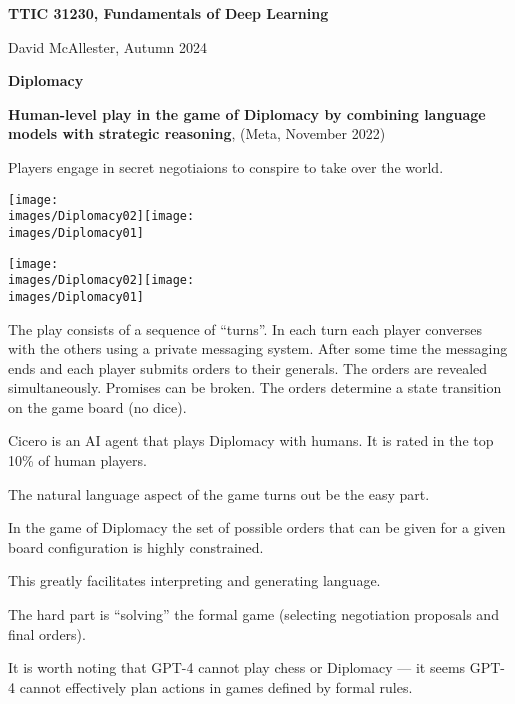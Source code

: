 




{\Huge

  \centerline{\bf TTIC 31230, Fundamentals of Deep Learning}
  \bigskip
  \centerline{David McAllester, Autumn 2024}


  \vfill
  \centerline{\bf Diplomacy}
  \vfill
  \vfill


{\bf Human-level play in the game of Diplomacy by combining language models with strategic reasoning}, (Meta, November 2022)

\vfill
Players engage in secret negotiaions to conspire to take over the world.

\vfill
\centerline{\texttt{[image: \\images/Diplomacy02]}\hfill\texttt{[image: \\images/Diplomacy01]}}


\vfill
\centerline{\texttt{[image: \\images/Diplomacy02]}\hspace{4em}\texttt{[image: \\images/Diplomacy01]}}

\vfill
The play consists of a sequence of ``turns''.  In each turn each player converses with the others using a private messaging system.  After some time the messaging ends and each player submits orders to their generals.  The orders are revealed simultaneously. Promises can be broken.  The orders determine a state transition on the game board (no dice).



Cicero is an AI agent that plays Diplomacy with humans.  It is rated in the top 10\% of human players.


The natural language aspect of the game turns out be the easy part.

\vfill
In the game of Diplomacy the set of possible orders that can be given for a given board configuration is highly constrained.

\vfill
This greatly facilitates interpreting and generating language.

\vfill
The hard part is ``solving'' the formal game (selecting negotiation proposals and final orders).


It is worth noting that GPT-4 cannot play chess or Diplomacy --- it seems GPT-4 cannot effectively plan actions in games defined by formal rules.

}
